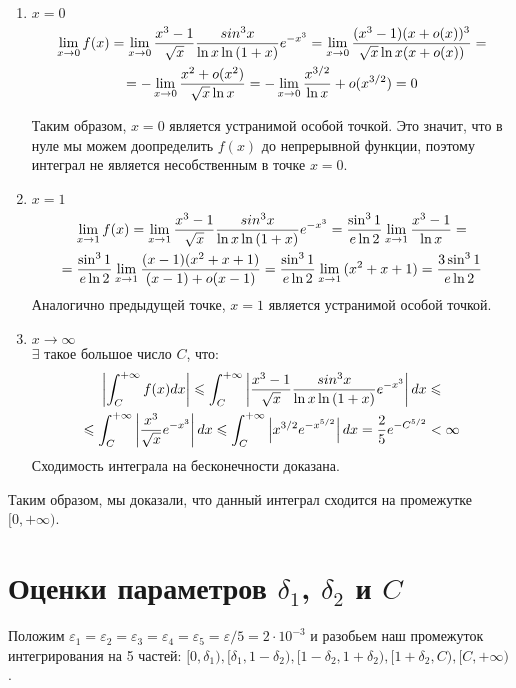 \documentclass[titlepage]{article}
\def\l{\left}
\def\r{\right}
\def\le{\leqslant}
\begin{document}
\begin{enumerate}
	\item $x = 0$ \\
	\begin{gather}
		\notag \lim_{x \to 0}{f(x)} = \lim_{x \to 0}{\frac{x^3-1}{\sqrt{x}}\frac{sin^3{x}}{\ln{x}\ln{(1+x)}}e^{-x^3}} = \lim_{x \to 0}{\frac{(x^3-1)(x + o(x))^3}{\sqrt{x}\ln{x}(x + o(x))}} = \\
		\notag = -\lim_{x \to 0}{\frac{x^2 + o(x^2)}{\sqrt{x}\ln{x}}} = -\lim_{x \to 0}{\frac{x^{3/2}}{\ln{x}} + o(x^{3/2})} = 0
	\end{gather}
	
Таким образом, $x = 0$ является устранимой особой точкой. Это значит, что в нуле мы можем доопределить $f(x)$ до непрерывной функции, поэтому интеграл не является несобственным в точке $x = 0$.

	\item $x = 1$ \\
	\begin{gather}
		\notag \lim_{x \to 1}{f(x)} = \lim_{x \to 1}{\frac{x^3-1}{\sqrt{x}}\frac{sin^3{x}}{\ln{x}\ln{(1+x)}}e^{-x^3}} = \frac{\sin^3{1}}{e\ln{2}}\lim_{x \to 1}{\frac{x^3 - 1}{\ln{x}}} = \\ \notag = \frac{\sin^3{1}}{e\ln{2}}\lim_{x \to 1}{\frac{(x-1)(x^2+x+1)}{(x-1) + o(x-1)}} = \frac{\sin^3{1}}{e\ln{2}}\lim_{x \to 1}{(x^2+x+1)} = \frac{3\sin^3{1}}{e\ln{2}}
	\end{gather}  
Аналогично предыдущей точке, $x = 1$ является устранимой особой точкой.
	\item $x \to \infty$ \\
	
	$\exists$ такое большое число $C$, что:
	\begin{gather}
		\notag \l| \int_{C}^{+\infty}{f(x)dx} \r| \le \int_{C}^{+\infty}{\l| \frac{x^3-1}{\sqrt{x}}\frac{sin^3{x}}{\ln{x}\ln{(1+x)}}e^{-x^3}\r|dx} \le \\ \notag \le\int_{C}^{+\infty}{\l| \frac{x^3}{\sqrt{x}}e^{-x^3}\r| dx} \le \int_{C}^{+\infty}{\l| x^{3/2}e^{-x^{5/2}} \r|dx} = \frac{2}{5}e^{-C^{5/2}} < \infty
	\end{gather}
Сходимость интеграла на бесконечности доказана.
\end{enumerate}

Таким образом, мы доказали, что данный интеграл сходится на промежутке $[0, +\infty)$.

\section{Оценки параметров $\delta_1$, $\delta_2$ и $C$}
Положим $\varepsilon_1 = \varepsilon_2 = \varepsilon_3 = \varepsilon_4 = \varepsilon_5 = \varepsilon/5 = 2\cdot10^{-3}$ и разобьем наш промежуток интегрирования на 5 частей: $[0, \delta_1), [\delta_1, 1-\delta_2), [1-\delta_2, 1+\delta_2), [1+\delta_2, C), [C, +\infty)$.
\end{document}
